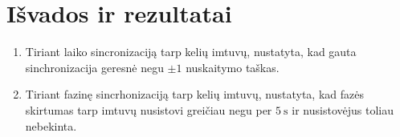 \documentclass[../gnss_interference_resistant_thesis.tex]{subfiles}
\begin{document}
\section*{Išvados ir rezultatai}

\begin{enumerate}
    \item Tiriant laiko sincronizaciją tarp kelių imtuvų, nustatyta, kad gauta sinchronizacija
          geresnė negu $\pm 1$ nuskaitymo taškas.
    \item Tiriant fazinę sincrhonizaciją tarp kelių imtuvų, nustatyta, kad fazės skirtumas
          tarp imtuvų nusistovi greičiau negu per $5\ \mathrm{s}$ ir nusistovėjus toliau nebekinta.
\end{enumerate}
\end{document}
